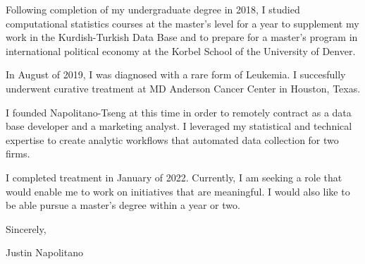 \documentclass{ExpressiveCoverLetter}
\begin{document}
\begin{flushleft}
\begin{normalsize}
    Following completion of my undergraduate degree in 2018, I studied computational statistics courses at the master's level for a year to supplement my work in the Kurdish-Turkish Data Base and to prepare for a master's program in international political economy at the Korbel School of the University of Denver.  

    In August of 2019, I was diagnosed with a rare form of Leukemia.  I succesfully underwent curative treatment at MD Anderson Cancer Center in Houston, Texas.

    I founded Napolitano-Tseng at this time in order to remotely contract as a data base developer and a marketing analyst.  I leveraged my statistical and technical expertise to create analytic workflows that automated data collection for two firms.

    I completed treatment in January of 2022.  Currently, I am seeking a role that would enable me to work on initiatives that are meaningful.  I would also like to be able pursue a master's degree within a year or two.  

    \vspace{.15in}

    Sincerely,

    \vspace{.15in}

    Justin Napolitano

\end{normalsize}
\end{flushleft}
\end{document}
